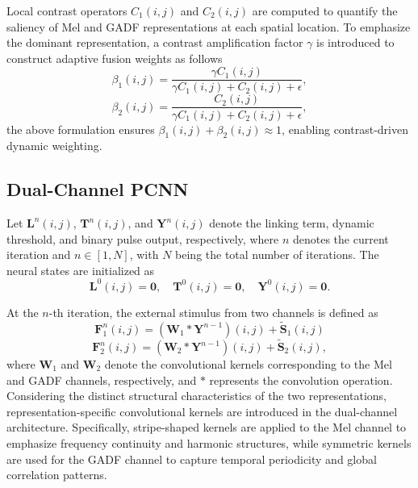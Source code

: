 \documentclass[anonymous]{iopjournal}
\begin{document}
Local contrast operators $C_1(i,j)$ and $C_2(i,j)$ are computed to quantify the saliency of Mel and GADF representations at each spatial location. To emphasize the dominant representation, a contrast amplification factor $\gamma$ is introduced to construct adaptive fusion weights as follows
\begin{equation}
	\beta_1(i,j) = 
	\frac{\gamma C_1(i,j)}
	{\gamma C_1(i,j) + C_2(i,j) + \epsilon},
	\label{eq:beta1}
\end{equation}
\begin{equation}
	\beta_2(i,j) = 
	\frac{C_2(i,j)}
	{\gamma C_1(i,j) + C_2(i,j) + \epsilon},
	\label{eq:beta2}
\end{equation}
the above formulation ensures $\beta_1(i,j) + \beta_2(i,j) \approx 1$, enabling contrast-driven dynamic weighting.

\subsection{Dual-Channel PCNN}
Let $\boldsymbol{L}^n(i,j)$, $\boldsymbol{T}^n(i,j)$, and $\boldsymbol{Y}^n(i,j)$ denote the linking term, dynamic threshold, and binary pulse output, respectively, where $n$ denotes the current iteration and $n \in [1, N]$, with $N$ being the total number of iterations. The neural states are initialized as
\begin{equation}
	\boldsymbol{L}^0(i,j) = \boldsymbol {0}, \quad 
	\boldsymbol{T}^0(i,j) = \boldsymbol {0}, \quad 
	\boldsymbol{Y}^0(i,j) = \boldsymbol {0}.
	\label{eq:initialization}
\end{equation}

At the $n$-th iteration, the external stimulus from two channels is defined as
\begin{equation}
	\boldsymbol{F}_1^n(i,j) = (\boldsymbol{W}_1 * \boldsymbol{Y}^{n-1})(i,j) + \boldsymbol{\tilde{S}}_1(i,j)
	\label{eq:f1_update}
\end{equation}
\begin{equation}
	\boldsymbol{F}_2^n(i,j) = (\boldsymbol{W}_2 * \boldsymbol{Y}^{n-1})(i,j) + \boldsymbol{\tilde{S}}_2(i,j),
	\label{eq:f2_update}
\end{equation}
where $\boldsymbol{W}_1$ and $\boldsymbol{W}_2$ denote the convolutional kernels corresponding to the Mel and GADF channels, respectively, and $*$ represents the convolution operation. Considering the distinct structural characteristics of the two representations, representation-specific convolutional kernels are introduced in the dual-channel architecture. Specifically, stripe-shaped kernels are applied to the Mel channel to emphasize frequency continuity and harmonic structures, while symmetric kernels are used for the GADF channel to capture temporal periodicity and global correlation patterns.
\end{document}
